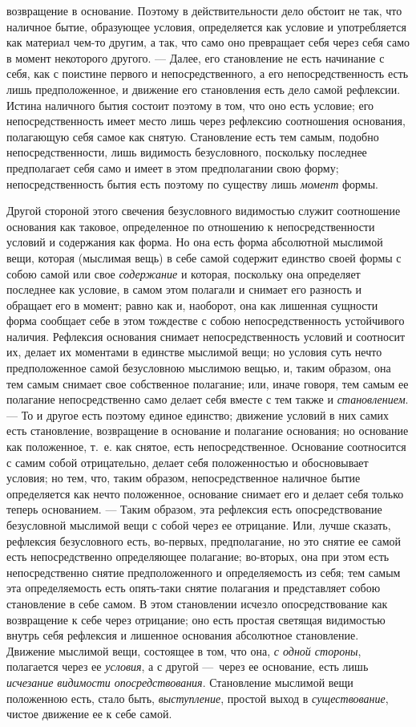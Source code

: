 возвращение в основание. Поэтому в действительности дело обстоит не так,
что наличное бытие, образующее условия, определяется как условие и
употребляется как материал чем-то другим, а так, что само оно превращает
себя через себя само в момент некоторого другого. — Далее, его становление
не есть начинание с себя, как с поистине первого и непосредственного, а его
непосредственность есть лишь предположенное, и движение его становления
есть дело самой рефлексии. Истина наличного бытия состоит поэтому в том,
что оно есть условие; его непосредственность имеет место лишь через
рефлексию соотношения основания, полагающую себя самое как снятую.
Становление есть тем самым, подобно непосредственности, лишь видимость
безусловного, поскольку последнее предполагает себя само и имеет в этом
предполагании свою форму; непосредственность бытия есть поэтому по существу
лишь {\em момент} формы.

Другой стороной этого свечения безусловного видимостью служит соотношение
основания как таковое, определенное по отношению к непосредственности
условий и содержания как форма. Но она есть форма абсолютной мыслимой вещи,
которая (мыслимая вещь) в себе самой содержит единство своей формы с собою
самой или свое {\em содержание} и которая, поскольку
она определяет последнее как условие, в самом этом полагали и снимает его
разность и обращает его в момент; равно как и, наоборот, она как лишенная
сущности форма сообщает себе в этом тождестве с собою непосредственность
устойчивого наличия. Рефлексия основания снимает непосредственность условий
и соотносит их, делает их моментами в единстве мыслимой вещи; но условия
суть нечто предположенное самой безусловною мыслимою вещью, и, таким
образом, она тем самым снимает свое собственное полагание; или, иначе
говоря, тем самым ее полагание непосредственно само делает себя вместе с
тем также и {\em становлением}. — То и другое есть
поэтому единое единство; движение условий в них самих есть становление,
возвращение в основание и полагание основания; но основание как положенное,
т.~е. как снятое, есть непосредственное. Основание соотносится с самим
собой отрицательно, делает себя положенностью и обосновывает условия; но
тем, что, таким образом, непосредственное наличное бытие определяется как
нечто положенное, основание снимает его и делает себя только теперь
основанием. — Таким образом, эта рефлексия есть опосредствование
безусловной мыслимой вещи с собой через ее отрицание. Или, лучше сказать,
рефлексия безусловного есть, во-первых, предполагание, но это снятие ее
самой есть непосредственно определяющее полагание; во-вторых, она при этом
есть непосредственно снятие предположенного и определяемость из себя; тем
самым эта определяемость есть опять-таки снятие полагания и представляет
собою становление в себе самом. В этом становлении исчезло опосредствование
как возвращение к себе через отрицание; оно есть простая светящая
видимостью внутрь себя рефлексия и лишенное основания абсолютное
становление. Движение мыслимой вещи, состоящее в том, что она,
{\em с одной стороны}, полагается через ее
{\em условия}, а с другой —~через ее основание, есть
лишь {\em исчезание видимости опосредствования}.
Становление мыслимой вещи положенною есть, стало быть,
{\em выступление}, простой выход в
{\em существование}, чистое движение ее к себе самой.

